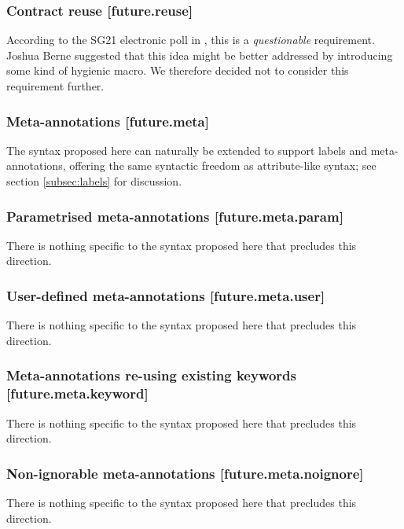 \subsubsection{Contract reuse  [future.reuse]}

According to the SG21 electronic poll in \cite{P2885R2}, this is a \emph{questionable} requirement. Joshua Berne suggested that this idea might be better addressed by introducing some kind of hygienic macro. We therefore decided not to consider this requirement further.

\subsubsection{Meta-annotations  [future.meta]}

The syntax proposed here can naturally be extended to support labels and meta-annotations, offering the same syntactic freedom as attribute-like syntax; see section \ref{subsec:labels} for discussion.

\subsubsection{Parametrised meta-annotations  [future.meta.param]}

There is nothing specific to the syntax proposed here that precludes this direction.

\subsubsection{User-defined meta-annotations  [future.meta.user]}

There is nothing specific to the syntax proposed here that precludes this direction.

\subsubsection{Meta-annotations re-using existing keywords  [future.meta.keyword]}

There is nothing specific to the syntax proposed here that precludes this direction.

\subsubsection{Non-ignorable meta-annotations  [future.meta.noignore]}

There is nothing specific to the syntax proposed here that precludes this direction.

